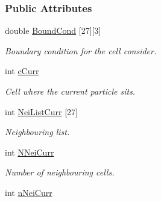 \subsubsection*{Public Attributes}
\begin{DoxyCompactItemize}
\item 
double \hyperlink{classDomDecBasics_ae47fdfe8f7b7de2ed9a00d0109696435}{Bound\+Cond} \mbox{[}27\mbox{]}\mbox{[}3\mbox{]}\hypertarget{classDomDecBasics_ae47fdfe8f7b7de2ed9a00d0109696435}{}\label{classDomDecBasics_ae47fdfe8f7b7de2ed9a00d0109696435}

\begin{DoxyCompactList}\small\item\em Boundary condition for the cell consider. \end{DoxyCompactList}\item 
int \hyperlink{classDomDecBasics_ab8d5dea32bdd50bc532a901e60a98067}{c\+Curr}\hypertarget{classDomDecBasics_ab8d5dea32bdd50bc532a901e60a98067}{}\label{classDomDecBasics_ab8d5dea32bdd50bc532a901e60a98067}

\begin{DoxyCompactList}\small\item\em Cell where the current particle sits. \end{DoxyCompactList}\item 
int \hyperlink{classDomDecBasics_a3f1699016098a6e8062fb140b2833206}{Nei\+List\+Curr} \mbox{[}27\mbox{]}\hypertarget{classDomDecBasics_a3f1699016098a6e8062fb140b2833206}{}\label{classDomDecBasics_a3f1699016098a6e8062fb140b2833206}

\begin{DoxyCompactList}\small\item\em Neighbouring list. \end{DoxyCompactList}\item 
int \hyperlink{classDomDecBasics_a16f1ee8ae2cd837bc80f24b844e50575}{N\+Nei\+Curr}\hypertarget{classDomDecBasics_a16f1ee8ae2cd837bc80f24b844e50575}{}\label{classDomDecBasics_a16f1ee8ae2cd837bc80f24b844e50575}

\begin{DoxyCompactList}\small\item\em Number of neighbouring cells. \end{DoxyCompactList}\item 
int \hyperlink{classDomDecBasics_a8c4a3cbd2beb1d216432d9659a8115b9}{n\+Nei\+Curr}\hypertarget{classDomDecBasics_a8c4a3cbd2beb1d216432d9659a8115b9}{}\label{classDomDecBasics_a8c4a3cbd2beb1d216432d9659a8115b9}


\end{DoxyCompactItemize}
